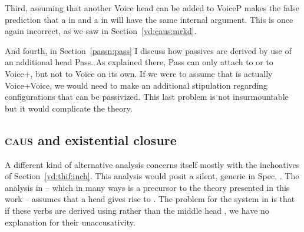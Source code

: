 \begin{exe}
\begin{xlist}
\begin{xlist}
\begin{exe}
\begin{exe}
\begin{xlist}
\begin{exe}
\begin{xlist}
\begin{exe}
\begin{xlist}
\begin{xlist}
\begin{exe}
\begin{xlist}
\begin{exe}
\begin{xlist}
\begin{exe}
\begin{xlist}
\begin{exe}
\begin{exe}
\begin{exe}
\begin{xlist}
\begin{exe}
\begin{exe}
\begin{xlist}
\begin{xlist}
\begin{exe}
\begin{xlist}
\begin{exe}
\begin{exe}
\begin{xlist}
\begin{exe}
\begin{exe}
\begin{xlist}
\begin{exe}
\begin{xlist}
\begin{exe}
\begin{xlist}
\begin{exe}
\begin{xlist}
\begin{exe}
\begin{exe}
\begin{xlist}
\begin{exe}
\begin{exe}
\begin{xlist}
\begin{xlist}
\begin{exe}
\begin{xlist}
\begin{xlist}
\begin{exe}
\begin{xlist}
\begin{exe}
\begin{xlist}
\begin{exe}
\begin{xlist}
\begin{exe}
\begin{xlist}
\begin{exe}
\begin{exe}
\begin{exe}
\begin{exe}
\begin{xlist}
\begin{exe}
\begin{exe}
\begin{xlist}
\begin{xlist}
\begin{exe}
\begin{exe}
\begin{xlist}
\begin{exe}
\begin{xlist}
Third, assuming that another Voice head can be added to VoiceP makes the false prediction that a  in {\tkal} and a  in {\thif} will have the same internal argument. This is once again incorrect, as we saw in Section~\ref{vd:caus:mrkd}.

And fourth, in Section~\ref{passn:pass} I discuss how passives are derived by use of an additional head Pass. As explained there, Pass can only attach to {\vd} or to Voice+{\va}, but not to Voice on its own. If we were to assume that {\vd} is actually Voice+Voice, we would need to make an additional stipulation regarding configurations that can be passivized. This last problem is not insurmountable but it would complicate the theory.

	
	\subsection{\textsc{caus} and existential closure} \label{vd:others:ed}
A different kind of alternative analysis concerns itself mostly with the inchoatives of Section~\ref{vd:thif:inch}. This analysis would posit a silent, generic  in Spec, {\vd}. The analysis in \citet[61]{doron03} -- which in many ways is a precursor to the theory presented in this work -- assumes that a  head  gives rise to {\thif}. The problem for the system in \cite{doron03} is that if these verbs are derived using  rather than the middle head , we have no explanation for their unaccusativity.


\end{xlist}
\end{exe}
\end{xlist}
\end{exe}
\end{exe}
\end{xlist}
\end{xlist}
\end{exe}
\end{exe}
\end{xlist}
\end{exe}
\end{exe}
\end{exe}
\end{exe}
\end{xlist}
\end{exe}
\end{xlist}
\end{exe}
\end{xlist}
\end{exe}
\end{xlist}
\end{exe}
\end{xlist}
\end{xlist}
\end{exe}
\end{xlist}
\end{xlist}
\end{exe}
\end{exe}
\end{xlist}
\end{exe}
\end{exe}
\end{xlist}
\end{exe}
\end{xlist}
\end{exe}
\end{xlist}
\end{exe}
\end{xlist}
\end{exe}
\end{exe}
\end{xlist}
\end{exe}
\end{exe}
\end{xlist}
\end{exe}
\end{xlist}
\end{xlist}
\end{exe}
\end{exe}
\end{xlist}
\end{exe}
\end{exe}
\end{exe}
\end{xlist}
\end{exe}
\end{xlist}
\end{exe}
\end{xlist}
\end{exe}
\end{xlist}
\end{xlist}
\end{exe}
\end{xlist}
\end{exe}
\end{xlist}
\end{exe}
\end{exe}
\end{xlist}
\end{xlist}
\end{exe}
